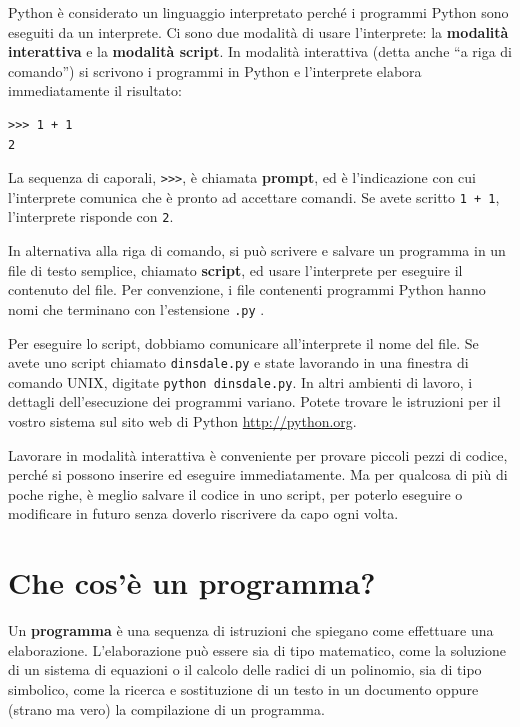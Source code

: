 \documentclass[10pt]{book}
\begin{document}
Python è considerato un linguaggio interpretato perché i programmi Python sono eseguiti da un interprete. Ci sono due modalità di usare l'interprete: la {\bf modalità interattiva} e la {\bf modalità script}. In modalità interattiva (detta anche ``a riga di comando'') si scrivono i programmi in Python e l'interprete elabora immediatamente il risultato:

\begin{verbatim}
>>> 1 + 1
2
\end{verbatim}
%
La sequenza di caporali, \verb">>>", è chiamata {\bf prompt}, ed è l'indicazione con cui l'interprete comunica che è pronto ad accettare comandi. Se avete scritto {\tt 1 + 1}, l'interprete risponde con {\tt 2}.

In alternativa alla riga di comando, si può scrivere e salvare un programma in un file di testo semplice, chiamato {\bf script}, ed usare l'interprete per eseguire il contenuto del file. Per convenzione, i file contenenti programmi Python hanno nomi che terminano con l'estensione {\tt .py} .

Per eseguire lo script, dobbiamo comunicare all'interprete il nome del file. Se avete uno script chiamato {\tt dinsdale.py} e state lavorando in una finestra di comando UNIX, digitate {\tt python dinsdale.py}. In altri ambienti di lavoro, i dettagli dell'esecuzione dei programmi variano. Potete trovare le istruzioni per il vostro sistema sul sito web di Python \url{http://python.org}.

Lavorare in modalità interattiva è conveniente per provare piccoli pezzi di codice, perché si possono inserire ed eseguire immediatamente. Ma per qualcosa di più di poche righe, è meglio salvare il codice in uno script, per poterlo eseguire o modificare in futuro senza doverlo riscrivere da capo ogni volta.


\section{Che cos'è un programma?}

Un {\bf programma} è una sequenza di istruzioni che spiegano come effettuare una elaborazione. L'elaborazione può essere sia di tipo matematico, come la soluzione di un sistema di equazioni o il calcolo delle radici di un polinomio, sia di tipo simbolico, come la ricerca e sostituzione di un testo in un documento oppure (strano ma vero) la compilazione di un programma.
\end{document}
